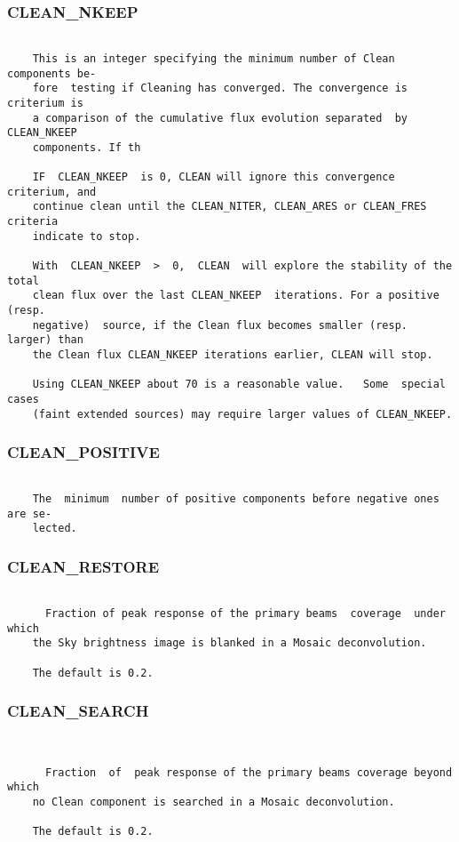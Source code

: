 \subsubsection{CLEAN\_NKEEP}
\begin{verbatim}

    This is an integer specifying the minimum number of Clean components be-
    fore  testing if Cleaning has converged. The convergence is criterium is
    a comparison of the cumulative flux evolution separated  by  CLEAN_NKEEP
    components. If th

    IF  CLEAN_NKEEP  is 0, CLEAN will ignore this convergence criterium, and
    continue clean until the CLEAN_NITER, CLEAN_ARES or CLEAN_FRES  criteria
    indicate to stop.

    With  CLEAN_NKEEP  >  0,  CLEAN  will explore the stability of the total
    clean flux over the last CLEAN_NKEEP  iterations. For a positive  (resp.
    negative)  source, if the Clean flux becomes smaller (resp. larger) than
    the Clean flux CLEAN_NKEEP iterations earlier, CLEAN will stop.

    Using CLEAN_NKEEP about 70 is a reasonable value.   Some  special  cases
    (faint extended sources) may require larger values of CLEAN_NKEEP.

\end{verbatim}
\subsubsection{CLEAN\_POSITIVE}
\begin{verbatim}

    The  minimum  number of positive components before negative ones are se-
    lected.

\end{verbatim}
\subsubsection{CLEAN\_RESTORE}
\begin{verbatim}

      Fraction of peak response of the primary beams  coverage  under  which
    the Sky brightness image is blanked in a Mosaic deconvolution.

    The default is 0.2.

\end{verbatim}
\subsubsection{CLEAN\_SEARCH}
\begin{verbatim}


      Fraction  of  peak response of the primary beams coverage beyond which
    no Clean component is searched in a Mosaic deconvolution.

    The default is 0.2.

\end{verbatim}
